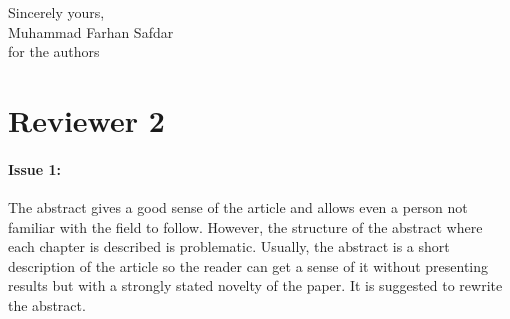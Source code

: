 \documentclass{article}
\begin{document}
\vspace{0.25in}

Sincerely yours,\\
Muhammad Farhan Safdar\\
for the authors


\section{Reviewer 2}

\paragraph{Issue 1:}
\begin{displayquote}
The abstract gives a good sense of the article and allows even a person not familiar with the field to follow. However, the structure of the abstract where each chapter is described is problematic. Usually, the abstract is a short description of the article so the reader can get a sense of it without presenting results but with a strongly stated novelty of the paper. It is suggested to rewrite the abstract.
\end{displayquote}
\end{document}
